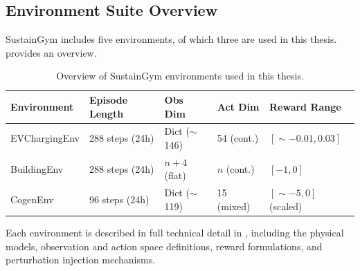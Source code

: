 \subsection{Environment Suite Overview}

SustainGym includes five environments, of which three are used in this thesis.  provides an overview.

\begin{table}[htbp]
\centering
\caption{Overview of SustainGym environments used in this thesis.}
\label{tab:sustaingym_overview}
\begin{tabular}{@{}lllll@{}}
\toprule
\textbf{Environment} & \textbf{Episode Length} & \textbf{Obs Dim} & \textbf{Act Dim} & \textbf{Reward Range} \\
\midrule
EVChargingEnv & 288 steps (24h) & Dict ($\sim$146) & 54 (cont.) & $[\sim{-}0.01, 0.03]$ \\
BuildingEnv & 288 steps (24h) & $n+4$ (flat) & $n$ (cont.) & $[-1, 0]$ \\
CogenEnv & 96 steps (24h) & Dict ($\sim$119) & 15 (mixed) & $[\sim{-}5, 0]$ (scaled) \\
\bottomrule
\end{tabular}
\end{table}

Each environment is described in full technical detail in , including the physical models, observation and action space definitions, reward formulations, and perturbation injection mechanisms.
